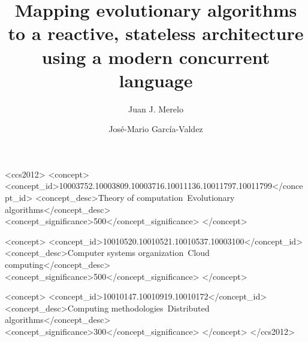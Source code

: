 \documentclass[sigconf]{acmart}
\begin{document}
\title{Mapping evolutionary algorithms to a reactive, stateless architecture
  using a modern concurrent language}

\author{Juan J. Merelo}

\author{José-Mario García-Valdez}

\renewcommand{\shortauthors}{J. J. Merelo et al.}

\begin{abstract}
\end{abstract}

\begin{CCSXML}
<ccs2012>
<concept>
<concept_id>10003752.10003809.10003716.10011136.10011797.10011799</concept_id>
<concept_desc>Theory of computation~Evolutionary algorithms</concept_desc>
<concept_significance>500</concept_significance>
</concept>

<concept>
<concept_id>10010520.10010521.10010537.10003100</concept_id>
<concept_desc>Computer systems organization~Cloud computing</concept_desc>
<concept_significance>500</concept_significance>
</concept>

<concept>
<concept_id>10010147.10010919.10010172</concept_id>
<concept_desc>Computing methodologies~Distributed algorithms</concept_desc>
<concept_significance>300</concept_significance>
</concept>
</ccs2012>
\end{CCSXML}




\maketitle
\end{document}
